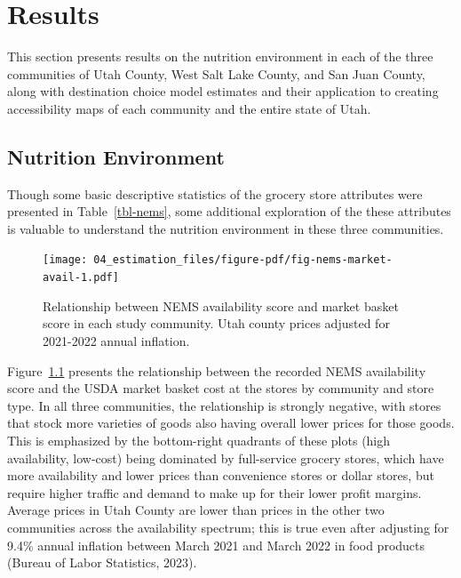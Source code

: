 \documentclass[
  letterpaper,
  DIV=11,
  numbers=noendperiod]{scrreport}
\begin{document}

\hypertarget{sec-results}{%
\chapter{Results}\label{sec-results}}

This section presents results on the nutrition environment in each of
the three communities of Utah County, West Salt Lake County, and San
Juan County, along with destination choice model estimates and their
application to creating accessibility maps of each community and the
entire state of Utah.

\hypertarget{sec-nems}{%
\section{Nutrition Environment}\label{sec-nems}}

Though some basic descriptive statistics of the grocery store attributes
were presented in Table~\ref{tbl-nems}, some additional exploration of
the these attributes is valuable to understand the nutrition environment
in these three communities.

\begin{figure}[t]

{\centering \texttt{[image: 04\_estimation\_files/figure-pdf/fig-nems-market-avail-1.pdf]}

}

\caption{\label{fig-nems-market-avail}Relationship between NEMS
availability score and market basket score in each study community. Utah
county prices adjusted for 2021-2022 annual inflation.}

\end{figure}

Figure~\ref{fig-nems-market-avail} presents the relationship between the
recorded NEMS availability score and the USDA market basket cost at the
stores by community and store type. In all three communities, the
relationship is strongly negative, with stores that stock more varieties
of goods also having overall lower prices for those goods. This is
emphasized by the bottom-right quadrants of these plots (high
availability, low-cost) being dominated by full-service grocery stores,
which have more availability and lower prices than convenience stores or
dollar stores, but require higher traffic and demand to make up for
their lower profit margins. Average prices in Utah County are lower than
prices in the other two communities across the availability spectrum;
this is true even after adjusting for 9.4\% annual inflation between
March 2021 and March 2022 in food products (Bureau of Labor Statistics,
2023).
\end{document}
